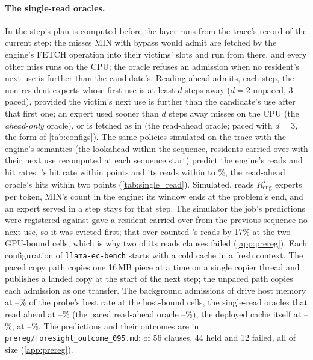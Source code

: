 \paragraph{The single-read oracles.} In \MinOne{} the step's plan is computed before the layer runs from the
trace's record of the current step: the misses MIN with bypass would admit are fetched by the engine's FETCH
operation into their victims' slots and run from there, and every other miss runs on the CPU; the oracle refuses an
admission when no resident's next use is further than the candidate's. Reading ahead admits, each step,
the non-resident experts whose first use is at least $d$ steps away ($d{=}2$ unpaced, 3 paced), provided the victim's
next use is further than the candidate's use after that first one; an expert used sooner than $d$ steps away misses
on the CPU (the \emph{ahead-only} oracle), or is fetched as in \MinOne{} (the read-ahead oracle; paced with $d{=}3$, the form of
\cref{tab:configs}). The same policies simulated on the trace with the engine's
semantics (the lookahead within the sequence, residents carried over with their next use recomputed at each sequence
start) predict the engine's reads and hit rates: \MinOne's hit rate within \fsfSimHitDiffMax{} points and its
reads within \fsfSimReadsDiffMin{} to \fsfSimReadsDiffMax\%, the read-ahead oracle's hits within two points
(\cref{tab:single_read}). Simulated, \MinOne{} reads $R^\star_{\mathrm{eng}}$ experts per token, MIN's count in the
engine: its window ends at the problem's end, and an expert served in a step stays for that step. The simulator the job's predictions were registered against gave a resident carried over
from the previous sequence no next use, so it was evicted first; that over-counted \MinOne's reads by 17\%
at the two GPU-bound cells, which is why two of its reads clauses failed (\cref{app:prereg}). Each configuration of
\texttt{llama-ec-bench} starts with a cold cache in a fresh context. The paced copy path copies one 16\,MB piece at a time on a single copier thread and
publishes a landed copy at the start of the next step; the unpaced path copies each admission as one transfer. The
background admissions of  drive host memory at \fshHostUtilMin--\fshHostUtilMax\% of the probe's best
rate at the host-bound cells, the single-read oracles that read ahead at \fsPrefetchHostUtilMin--\fsPrefetchHostUtilMax\%
(the paced read-ahead oracle \fsbpHostUtilMin--\fsbpHostUtilMax\%), the deployed cache itself at \fsBaseHostUtilMin--\fsBaseHostUtilMax\%,
\MinOne{} at \fsfHostUtilMin--\fsfHostUtilMax\%. The predictions and their outcomes are in
\texttt{prereg/foresight\_outcome\_095.md}: of 56 clauses, 44 held and 12 failed, all of size (\cref{app:prereg}).

